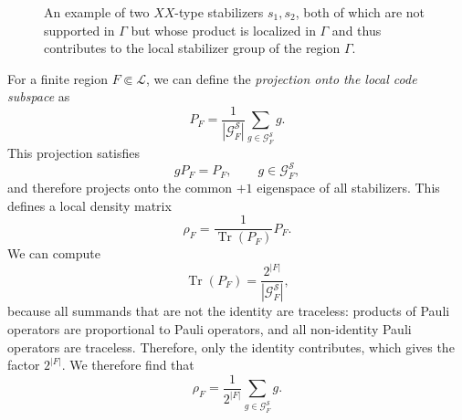 \documentclass[aps,pra,reprint,superscriptaddress]{revtex4-2}
\newcommand{\cG}{{\mathcal G}}
\newcommand{\cL}{{\mathcal L}}
\newcommand{\cS}{{\mathcal S}}
\newcommand\G{\Gamma}
\newcommand\x{\xi}
\newcommand\y{\psi}
\theoremstyle{definition}
\theoremstyle{remark}
\begin{document}
\begin{figure}
    \caption{An example of two $X X$-type stabilizers $s_1,s_2$, both of which are not supported in $\G$ but whose product is localized in $\G$ and thus contributes to the local stabilizer group of the region $\G$.}
    \label{fig:nontrivial-local-stabilizer-group-element}
\end{figure}
For a finite region $F\Subset\cL$, we can define the \emph{projection onto
the local code subspace} as
\begin{equation}\label{eq:projection_local}
    P_F=\frac{1}{|\cG^{\cS}_{F}|}\sum_{g\in\cG^{\cS}_{F}}g.
\end{equation}
This projection satisfies
\begin{equation}
    gP_F=P_F,
    \qquad g\in\cG^{\cS}_{F},
\end{equation}
and therefore projects onto the common $+1$ eigenspace of all stabilizers.
This defines a local density matrix
\begin{equation}
    \rho_F=\frac{1}{\operatorname{Tr}(P_F)}P_F.
\end{equation}
We can compute
\begin{equation}
    \operatorname{Tr}(P_F)=\frac{2^{|F|}}{|\cG^{\cS}_{F}|},
\end{equation}
because all summands that are not the identity are traceless: products of
Pauli operators are proportional to Pauli operators, and all non-identity Pauli
operators are traceless. Therefore, only the identity contributes, which gives the factor
$2^{|F|}$. We therefore find that
\begin{equation}
    \rho_F=\frac{1}{2^{|F|}}\sum_{g\in\cG^{\cS}_{F}}g.
    \label{eq:local_density_full}
\end{equation}
\end{document}
